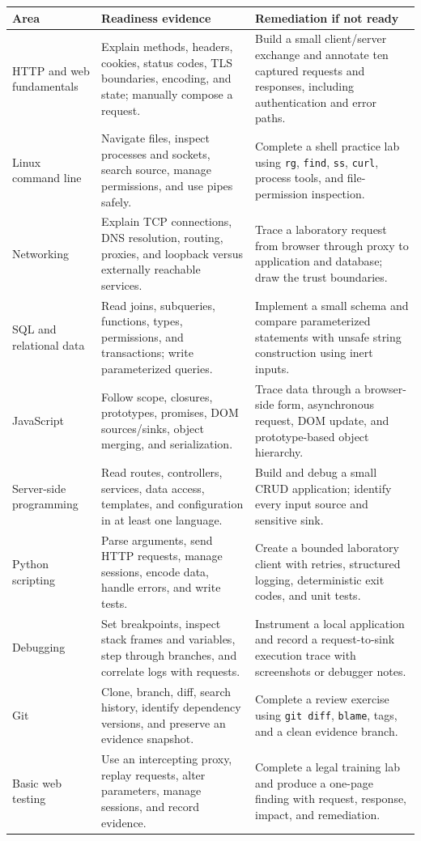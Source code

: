 \documentclass[11pt]{article}
\begin{document}
\begin{longtable}{@{}L{0.18\textwidth}L{0.31\textwidth}L{0.39\textwidth}@{}}
\toprule
\textbf{Area} & \textbf{Readiness evidence} & \textbf{Remediation if not ready} \\
\midrule
\endhead
HTTP and web fundamentals & Explain methods, headers, cookies, status codes, TLS boundaries, encoding, and state; manually compose a request. & Build a small client/server exchange and annotate ten captured requests and responses, including authentication and error paths. \\
Linux command line & Navigate files, inspect processes and sockets, search source, manage permissions, and use pipes safely. & Complete a shell practice lab using \texttt{rg}, \texttt{find}, \texttt{ss}, \texttt{curl}, process tools, and file-permission inspection. \\
Networking & Explain TCP connections, DNS resolution, routing, proxies, and loopback versus externally reachable services. & Trace a laboratory request from browser through proxy to application and database; draw the trust boundaries. \\
SQL and relational data & Read joins, subqueries, functions, types, permissions, and transactions; write parameterized queries. & Implement a small schema and compare parameterized statements with unsafe string construction using inert inputs. \\
JavaScript & Follow scope, closures, prototypes, promises, DOM sources/sinks, object merging, and serialization. & Trace data through a browser-side form, asynchronous request, DOM update, and prototype-based object hierarchy. \\
Server-side programming & Read routes, controllers, services, data access, templates, and configuration in at least one language. & Build and debug a small CRUD application; identify every input source and sensitive sink. \\
Python scripting & Parse arguments, send HTTP requests, manage sessions, encode data, handle errors, and write tests. & Create a bounded laboratory client with retries, structured logging, deterministic exit codes, and unit tests. \\
Debugging & Set breakpoints, inspect stack frames and variables, step through branches, and correlate logs with requests. & Instrument a local application and record a request-to-sink execution trace with screenshots or debugger notes. \\
Git & Clone, branch, diff, search history, identify dependency versions, and preserve an evidence snapshot. & Complete a review exercise using \texttt{git diff}, \texttt{blame}, tags, and a clean evidence branch. \\
Basic web testing & Use an intercepting proxy, replay requests, alter parameters, manage sessions, and record evidence. & Complete a legal training lab and produce a one-page finding with request, response, impact, and remediation. \\
\bottomrule
\end{longtable}
\end{document}
